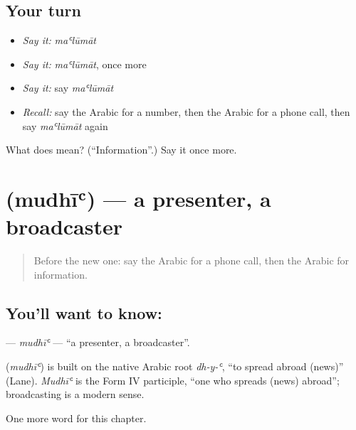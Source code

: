 \subsection*{Your turn}
\begin{itemize}
\raggedright
  \item \emph{Say it:} \emph{maʿlūmāt}
  \item \emph{Say it:} \emph{maʿlūmāt}, once more
  \item \emph{Say it:} say \emph{maʿlūmāt}
  \item \emph{Recall:} say the Arabic for a number, then the Arabic for a phone call, then say \emph{maʿlūmāt} again
\end{itemize}

\begin{tcolorbox}[breakable,colback=teal!4,colframe=teal!35!black,title={Before you move on}]
What does  mean? (\textquotedblleft{}Information\textquotedblright{}.) Say it once more.
\end{tcolorbox}
\section[\texorpdfstring{\ar{مذيع} (mudhīʿ)}{مذيع (mudhīʿ)}]{ (mudhīʿ) — a presenter, a broadcaster}

\label{lesson:AR-C281-mudhi}



\begin{quote}
Before the new one: say the Arabic for a phone call, then the Arabic for information.
\end{quote}

\subsection*{You'll want to know: }
\textbf{} — \emph{mudhīʿ} — \textquotedblleft{}a presenter, a broadcaster\textquotedblright{}.

\begin{cousinweb}
\textbf{} (\emph{mudhīʿ}) is built on the native Arabic root \emph{dh-y-ʿ}, \textquotedblleft{}to spread abroad (news)\textquotedblright{} (Lane). \emph{Mudhīʿ} is the Form IV participle, \textquotedblleft{}one who spreads (news) abroad\textquotedblright{}; broadcasting is a modern sense.
\end{cousinweb}

\begin{grammarlens}[title={What you've built}]
One more word for this chapter.
\end{grammarlens}

